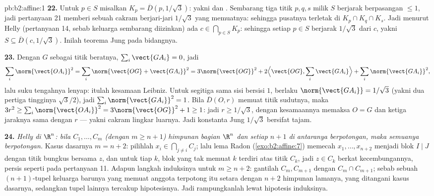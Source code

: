\begin{solution}{pb:b2:affine:1}
\textbf{22.} Untuk $p \in S$ misalkan $K_p = \overline D(p,
1/\sqrt3)$: yakni  dan . Sembarang tiga titik $p, q, s$ milik $S$
berjarak berpasangan $\leq 1$, jadi pertanyaan 21 memberi sebuah
cakram berjari-jari $1/\sqrt3$ yang memuatnya: sehingga pusatnya terletak di
$K_p \cap K_q \cap K_s$. Jadi menurut Helly  (pertanyaan 14, sebab
keluarga sembarang diizinkan) ada $c \in \bigcap_{p\in
S}K_p$: sehingga setiap $p \in S$ berjarak $1/\sqrt3$ dari $c$, yakni $S
\subseteq \overline D(c, 1/\sqrt3)$. Inilah teorema Jung
pada bidangnya.

\textbf{23.} Dengan $G$ sebagai titik beratnya, $\sum_i\vect{GA_i} = 0$,
jadi
\[
\sum_i\norm{\vect{OA_i}}^2 = \sum_i\norm{\vect{OG} +
\vect{GA_i}}^2 = 3\norm{\vect{OG}}^2 + 2\Bigl\langle
\vect{OG}, \sum_i\vect{GA_i}\Bigr\rangle +
\sum_i\norm{\vect{GA_i}}^2,
\]
lalu suku tengahnya lenyap: itulah kesamaan Leibniz. Untuk
segitiga sama sisi bersisi $1$, berlaku $\norm{\vect{GA_i}} =
1/\sqrt3$ (yakni dua pertiga tingginya $\sqrt3/2$), jadi
$\sum_i\norm{\vect{GA_i}}^2 = 1$. Bila $\overline D(O, r)$
memuat titik sudutnya, maka $3r^2 \geq
\sum_i\norm{\vect{OA_i}}^2 = 3\norm{\vect{OG}}^2 + 1 \geq 1$:
jadi $r \geq 1/\sqrt3$, dengan kesamaannya memaksa $O = G$ dan ketiga
jaraknya sama dengan $r$ --- yakni cakram lingkar luarnya. Jadi konstanta
Jung $1/\sqrt3$ bersifat tajam.

\textbf{24.} \emph{Helly di $\R^n$: bila $C_1, \dots, C_m$
(dengan $m \geq n + 1$) himpunan bagian  $\R^n$ dan setiap $n + 1$
di antaranya berpotongan, maka semuanya berpotongan.} Kasus dasarnya $m = n +
2$: pilihlah $x_i \in \bigcap_{j\neq i}C_j$; lalu lema Radon
(\cref{exo:b2:affine:7}) memecah $x_1, \dots, x_{n+2}$ menjadi
blok $I \mid J$ dengan titik bungkus bersama $z$, dan untuk tiap
$k$, blok yang tak memuat $k$ terdiri atas titik
$C_k$, jadi $z \in C_k$ berkat kecembungannya, persis seperti pada pertanyaan
11. Adapun langkah induksinya untuk $m \geq n + 2$: gantilah $C_m,
C_{m+1}$ dengan $C_m \cap C_{m+1}$; sebab sebuah $(n+1)$-tupel keluarga
barunya yang memuat anggota terpotong itu setara dengan $n + 2$
himpunan lamanya, yang ditangani kasus dasarnya, sedangkan tupel
lainnya tercakup hipotesisnya. Jadi rampungkanlah lewat hipotesis
induksinya.


\end{solution}
